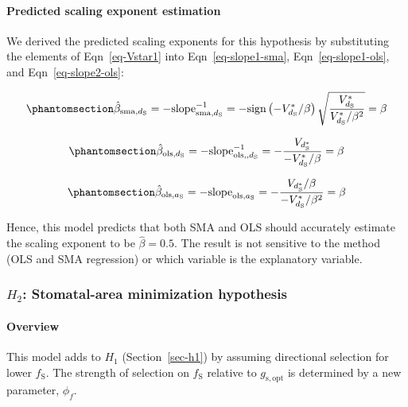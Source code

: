 \documentclass[
  letterpaper,
  DIV=11,
  numbers=noendperiod]{scrartcl}
\let\oldparagraph\paragraph
\renewcommand{\paragraph}[1]{\oldparagraph{#1}\mbox{}}
\begin{document}
\paragraph{Predicted scaling exponent
estimation}\label{predicted-scaling-exponent-estimation}

We derived the predicted scaling exponents for this hypothesis by
substituting the elements of Eqn~\ref{eq-Vstar1} into
Eqn~\ref{eq-slope1-sma}, Eqn~\ref{eq-slope1-ols}, and
Eqn~\ref{eq-slope2-ols}:

\begin{equation}\phantomsection\label{eq-est-sma11}{\hat{\beta}_{\text{sma},d_\mathrm{S}} = -\text{slope}_{\text{sma},d_\mathrm{S}}^{-1} = - \text{sign} \left( -V_{d_\mathrm{S}}^* / \beta \right) \sqrt{ \frac{V_{d_\mathrm{S}}^*}{V_{d_\mathrm{S}}^* / \beta^2} } = \beta}\end{equation}

\begin{equation}\phantomsection\label{eq-est-ols11}{\hat{\beta}_{\text{ols},d_\mathrm{S}} = -\text{slope}_{\text{ols},,d_\mathrm{S}}^{-1} = -\frac{V_{d_\mathrm{S}^*}}{-V_{d_\mathrm{S}}^* / \beta} = \beta}\end{equation}

\begin{equation}\phantomsection\label{eq-est-ols21}{\hat{\beta}_{\text{ols},a_\mathrm{S}} = -\text{slope}_{\text{ols},a_\mathrm{S}} = -\frac{V_{d_\mathrm{S}^*} / \beta}{-V_{d_\mathrm{S}}^* / \beta ^ 2} = \beta}\end{equation}

Hence, this model predicts that both SMA and OLS should accurately
estimate the scaling exponent to be \(\hat{\beta} = 0.5\). The result is
not sensitive to the method (OLS and SMA regression) or which variable
is the explanatory variable.

\subsubsection{\texorpdfstring{\(H_2\): Stomatal-area minimization
hypothesis}{H\_2: Stomatal-area minimization hypothesis}}\label{sec-h2}

\paragraph{Overview}\label{overview-1}

This model adds to \(H_1\) (Section~\ref{sec-h1}) by assuming
directional selection for lower \(f_\mathrm{S}\). The strength of
selection on \(f_\mathrm{S}\) relative to \(g_\mathrm{s,opt}\) is
determined by a new parameter, \(\phi_f\).
\end{document}
